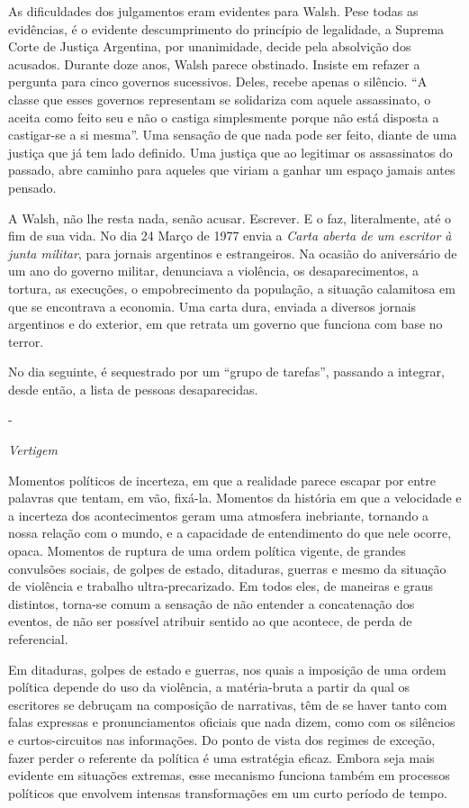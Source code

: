 As dificuldades dos julgamentos eram evidentes para Walsh. Pese todas as
evidências, é o evidente descumprimento do princípio de legalidade, a
Suprema Corte de Justiça Argentina, por unanimidade, decide pela
absolvição dos acusados. Durante doze anos, Walsh parece obstinado.
Insiste em refazer a pergunta para cinco governos sucessivos. Deles,
recebe apenas o silêncio. ``A classe que esses governos representam se
solidariza com aquele assassinato, o aceita como feito seu e não o
castiga simplesmente porque não está disposta a castigar-se a si
mesma''. Uma sensação de que nada pode ser feito, diante de uma justiça
que já tem lado definido. Uma justiça que ao legitimar os assassinatos
do passado, abre caminho para aqueles que viriam a ganhar um espaço
jamais antes pensado.

A Walsh, não lhe resta nada, senão acusar. Escrever. E o faz,
literalmente, até o fim de sua vida. No dia 24 Março de 1977 envia a
\emph{Carta aberta de um escritor à junta militar}, para jornais
argentinos e estrangeiros. Na ocasião do aniversário de um ano do
governo militar, denunciava a violência, os desaparecimentos, a tortura,
as execuções, o empobrecimento da população, a situação calamitosa em
que se encontrava a economia. Uma carta dura, enviada a diversos jornais
argentinos e do exterior, em que retrata um governo que funciona com
base no terror.

No dia seguinte, é sequestrado por um ``grupo de tarefas'', passando a
integrar, desde então, a lista de pessoas desaparecidas.

-

\emph{Vertigem}

Momentos políticos de incerteza, em que a realidade parece escapar por
entre palavras que tentam, em vão, fixá-la. Momentos da história em que
a velocidade e a incerteza dos acontecimentos geram uma atmosfera
inebriante, tornando a nossa relação com o mundo, e a capacidade de
entendimento do que nele ocorre, opaca. Momentos de ruptura de uma ordem
política vigente, de grandes convulsões sociais, de golpes de estado,
ditaduras, guerras e mesmo da situação de violência e trabalho
ultra-precarizado. Em todos eles, de maneiras e graus distintos,
torna-se comum a sensação de não entender a concatenação dos eventos, de
não ser possível atribuir sentido ao que acontece, de perda de
referencial.

Em ditaduras, golpes de estado e guerras, nos quais a imposição de uma
ordem política depende do uso da violência, a matéria-bruta a partir da
qual os escritores se debruçam na composição de narrativas, têm de se
haver tanto com falas expressas e pronunciamentos oficiais que nada
dizem, como com os silêncios e curtos-circuitos nas informações. Do
ponto de vista dos regimes de exceção, fazer perder o referente da
política é uma estratégia eficaz. Embora seja mais evidente em situações
extremas, esse mecanismo funciona também em processos políticos que
envolvem intensas transformações em um curto período de tempo.

